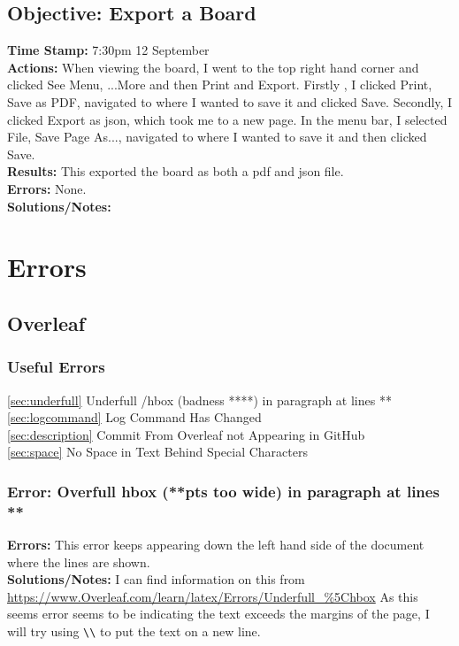 \documentclass{article}
\begin{document}
\begin{FlushLeft}
\subsection{Objective: Export a Board}
\textbf{Time Stamp:} 7:30pm 12 September\\
\textbf{Actions:} When viewing the board, I went to the top right hand corner and clicked See Menu, ...More and then Print and Export. Firstly , I clicked Print, Save as PDF, navigated to where I wanted to save it and clicked Save. Secondly, I clicked Export as json, which took me to a new page. In the menu bar, I selected File, Save Page As..., navigated to where I wanted to save it and then clicked Save.\\
\textbf{Results:} This exported the board as both a pdf and json file. \\
\textbf{Errors:} None.\\
\textbf{Solutions/Notes:}\\

\pagebreak


\section{Errors}
\subsection{Overleaf}

\subsubsection{Useful Errors}
\autoref{sec:underfull} Underfull /hbox (badness ****) in paragraph at lines **\\
\autoref{sec:logcommand} Log Command Has Changed\\
\autoref{sec:description} Commit From Overleaf not Appearing in GitHub\\
\autoref{sec:space} No Space in Text Behind Special Characters

\subsubsection{Error: Overfull hbox (**pts too wide) in paragraph at lines **}
\textbf{Errors:} This error keeps appearing down the left hand side of the document where the lines are shown.\\
\textbf{Solutions/Notes:} I can find information on this from \url{https://www.Overleaf.com/learn/latex/Errors/Underfull_%5Chbox}
As this seems error seems to be indicating the text exceeds the margins of the page, I will try using \verb|\\| to put the text on a new line. 


\end{FlushLeft}
\end{document}
